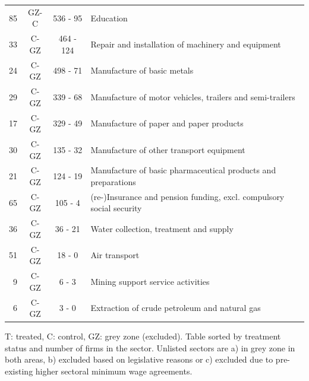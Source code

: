 \begin{table}[htbp]
\begin{threeparttable}
\begin{tabular}{r|c|c|l}
85&	GZ-C&	536 - 95&	Education\\
33&	C-GZ&	464 - 124&	Repair and installation of machinery and equipment\\
24&	C-GZ&	498 - 71&	Manufacture of basic metals\\
29&	C-GZ&	339 - 68&	Manufacture of motor vehicles, trailers and semi-trailers\\
17&	C-GZ&	329 - 49&	Manufacture of paper and paper products\\
30&	C-GZ&	135 - 32&	Manufacture of other transport equipment\\
21&	C-GZ&	124 - 19&	Manufacture of basic pharmaceutical products and preparations\\
65&	C-GZ&	105 - 4&	(re-)Insurance and pension funding, excl. compulsory social security\\
36&	C-GZ&	36 - 21&	Water collection, treatment and supply\\
51&	C-GZ&	18 - 0&	Air transport\\
9&	C-GZ&	6 - 3&	Mining support service activities\\
6&	C-GZ&	3 - 0&	Extraction of crude petroleum and natural gas\\
    \bottomrule
    \end{tabular}
\begin{tablenotes}
\item \footnotesize T: treated, C: control, GZ: grey zone (excluded). Table sorted by treatment status and number of firms in the sector. Unlisted sectors are a) in grey zone in both areas, b) excluded based on legislative reasons or c) excluded due to pre-existing higher sectoral minimum wage agreements.
\end{tablenotes}
\end{threeparttable}
\end{table}